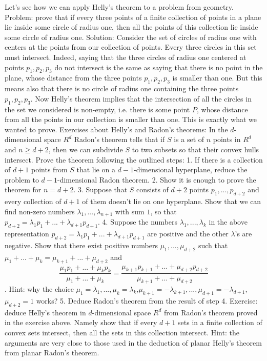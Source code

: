 Let's see how we can apply Helly's theorem to a problem from geometry.
Problem: prove that if every three points of a finite collection of points in a plane lie inside some circle of radius one, then all the points of this collection lie inside some circle of radius one.
Solution: Consider the set of circles of radius one with centers at the points from our collection of points. Every three circles in this set must intersect. Indeed, saying that the three circles of radius one centered at points $p_1,p_2,p_3$ do not intersect is the same as saying that there is no point in the plane, whose distance from the three points $p_1,p_2,p_3$ is smaller than one. But this means also that there is no circle of radius one containing the three points $p_1,p_2,p_3$.
Now Helly's theorem implies that the intersection of all the circles in the set we considered is non-empty, i.e. there is some point $P$, whose distance from all the points in our collection is smaller than one. This is exactly what we wanted to prove.
Exercises about Helly's and Radon's theorems:
In the $d$-dimensional space $R^d$ Radon's theorem tells that if $S$ is a set of $n$ points in $R^d$ and $n\ge d+2$, then we can subdivide $S$ to two subsets so that their convex hulls intersect. Prove the theorem following the outlined steps:
1. If there is a collection of $d+1$ points from $S$ that lie on a $d-1$-dimensional hyperplane, reduce the problem to $d-1$-dimensional Radon theorem.
2. Show it is enough to prove the theorem for $n=d+2$.
3. Suppose that $S$ consists of $d+2$ points $p_1,...,p_{d+2}$ and every collection of $d+1$ of them doesn't lie on one hyperplane. Show that we can find non-zero numbers $\lambda_1,...,\lambda_{n+1}$ with sum $1$, so that $p_{d+2}=\lambda_1 p_1+...+\lambda_{d+1} p_{d+1}$.
4. Suppose the numbers $\lambda_1,...,\lambda_k$ in the above representation $p_{d+2}=\lambda_1 p_1+...+\lambda_{d+1} p_{d+1}$ are positive and the other $\lambda$'s are negative. Show that there exist positive numbers $\mu_1,...,\mu_{d+2}$ such that $\mu_1+...+\mu_k=\mu_{k+1}+...+\mu_{d+2}$ and $$\frac{\mu_1 p_1 + ... +\mu_k p_k}{\mu_1+...+\mu_{k}}=\frac{\mu_{k+1} p_{k+1}+...+\mu_{d+2} p_{d+2}}{\mu_{k+1}+...+\mu_{d+2}}$$.
Hint: why the choice $\mu_1=\lambda_1,...,\mu_k=\lambda_k$,$\mu_{k+1}=-\lambda_{k+1},...,\mu_{d+1}=-\lambda_{d+1}$,$\mu_{d+2}=1$ works?
5. Deduce Radon's theorem from the result of step 4.
Exercise: deduce Helly's theorem in $d$-dimensional space $R^d$ from Radon's theorem proved in the exercise above. Namely show that if every $d+1$ sets in a finite collection of convex sets intersect, then all the sets in this collection intersect.
Hint: the arguments are very close to those used in the deduction of planar Helly's theorem from planar Radon's theorem.
